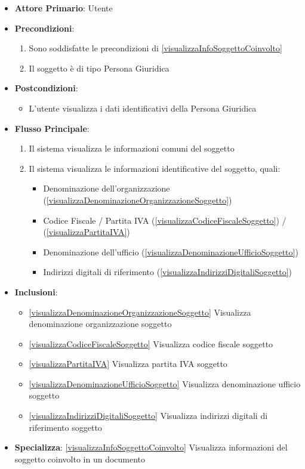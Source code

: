 \begin{itemize}
    \item \textbf{Attore Primario}: Utente

    \item \textbf{Precondizioni}:
    \begin{enumerate}
        \item Sono soddisfatte le precondizioni di \ref{visualizzaInfoSoggettoCoinvolto}
        \item Il soggetto è di tipo Persona Giuridica
    \end{enumerate}

    \item \textbf{Postcondizioni}:
    \begin{itemize}
        \item L'utente visualizza i dati identificativi della Persona Giuridica
    \end{itemize}

    \item \textbf{Flusso Principale}:
    \begin{enumerate}
        \item Il sistema visualizza le informazioni comuni del soggetto
        \item Il sistema visualizza le informazioni identificative del soggetto, quali:
        \begin{itemize}
            \item Denominazione dell'organizzazione (\ref{visualizzaDenominazioneOrganizzazioneSoggetto})
            \item Codice Fiscale / Partita IVA (\ref{visualizzaCodiceFiscaleSoggetto}) / (\ref{visualizzaPartitaIVA})
            \item Denominazione dell'ufficio (\ref{visualizzaDenominazioneUfficioSoggetto})
            \item Indirizzi digitali di riferimento (\ref{visualizzaIndirizziDigitaliSoggetto})
        \end{itemize}
    \end{enumerate}
    \item \textbf{Inclusioni}: 
    \begin{itemize}
        \item \ref{visualizzaDenominazioneOrganizzazioneSoggetto} Visualizza denominazione organizzazione soggetto
        \item \ref{visualizzaCodiceFiscaleSoggetto} Visualizza codice fiscale soggetto
        \item \ref{visualizzaPartitaIVA} Visualizza partita IVA soggetto
        \item \ref{visualizzaDenominazioneUfficioSoggetto} Visualizza denominazione ufficio soggetto
        \item \ref{visualizzaIndirizziDigitaliSoggetto} Visualizza indirizzi digitali di riferimento soggetto
    \end{itemize}
    \item \textbf{Specializza}: \ref{visualizzaInfoSoggettoCoinvolto} Visualizza informazioni del soggetto coinvolto in un documento
\end{itemize}
